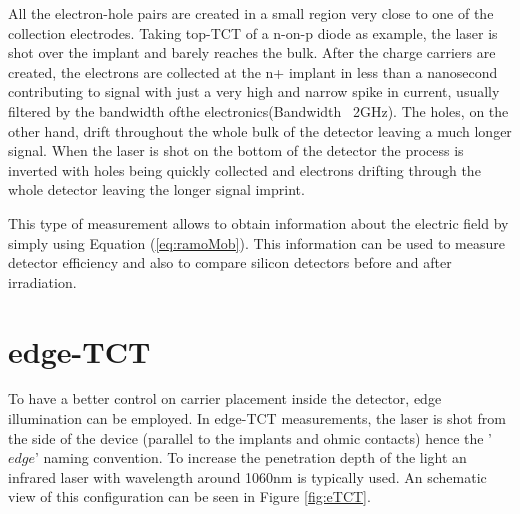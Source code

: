 All the electron-hole pairs are created in a small region very close to one of the collection electrodes. Taking top-TCT of a n-on-p diode as example, the laser is shot over the implant and barely reaches the bulk. After the charge carriers are created, the electrons are collected at the n+ implant in less than a nanosecond contributing to signal with just a very high and narrow spike in current, usually filtered by the bandwidth ofthe electronics(Bandwidth ~2GHz). The holes, on the other hand, drift throughout the whole bulk of the detector leaving a much longer signal. When the laser is shot on the bottom of the detector the process is inverted with holes being quickly collected and electrons drifting through the whole detector leaving the longer signal imprint.

This type of measurement allows to obtain information about the electric field by simply using Equation (\ref{eq:ramoMob}). This information can be used to measure detector efficiency and also to compare silicon detectors before and after irradiation. 



\section{edge-TCT} %
\label{sec:eTCT}


To have a better control on carrier placement inside the detector, edge illumination can be employed. In edge-TCT measurements, the laser is shot from the side of the device (parallel to the implants and ohmic contacts) hence the '$edge$' naming convention. To increase the penetration depth of the light an infrared laser with wavelength around 1060nm is typically used. An schematic view of this configuration can be seen in Figure \ref{fig:eTCT}.

